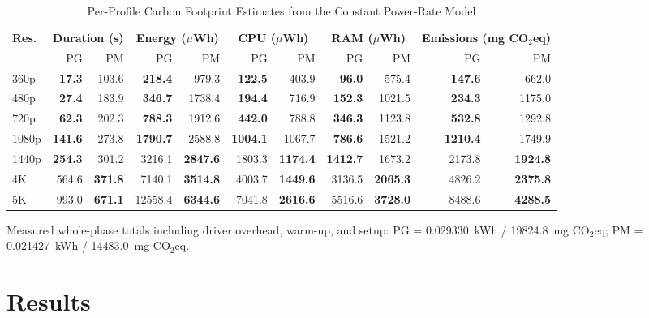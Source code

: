\documentclass[conference]{IEEEtran}
\begin{document}
\begin{table}[htbp]
\centering
\renewcommand{\arraystretch}{1.1}
\caption{Per-Profile Carbon Footprint Estimates from the Constant Power-Rate Model}
\label{tab:carbon_summary}
\begin{tabular}{l rr rr rr rr rr}
\hline
\textbf{Res.}
  & \multicolumn{2}{c}{\textbf{Duration (s)}}
  & \multicolumn{2}{c}{\textbf{Energy (\(\mu\)Wh)}}
  & \multicolumn{2}{c}{\textbf{CPU (\(\mu\)Wh)}}
  & \multicolumn{2}{c}{\textbf{RAM (\(\mu\)Wh)}}
  & \multicolumn{2}{c}{\textbf{Emissions (mg CO$_2$eq)}} \\
  & PG & PM & PG & PM & PG & PM & PG & PM & PG & PM \\
\hline
360p  & \textbf{17.3} & 103.6 & \textbf{218.4} & 979.3 & \textbf{122.5} & 403.9 & \textbf{96.0} & 575.4 & \textbf{147.6} & 662.0 \\
480p  & \textbf{27.4} & 183.9 & \textbf{346.7} & 1738.4 & \textbf{194.4} & 716.9 & \textbf{152.3} & 1021.5 & \textbf{234.3} & 1175.0 \\
720p  & \textbf{62.3} & 202.3 & \textbf{788.3} & 1912.6 & \textbf{442.0} & 788.8 & \textbf{346.3} & 1123.8 & \textbf{532.8} & 1292.8 \\
1080p & \textbf{141.6} & 273.8 & \textbf{1790.7} & 2588.8 & \textbf{1004.1} & 1067.7 & \textbf{786.6} & 1521.2 & \textbf{1210.4} & 1749.9 \\
1440p & \textbf{254.3} & 301.2 & 3216.1 & \textbf{2847.6} & 1803.3 & \textbf{1174.4} & \textbf{1412.7} & 1673.2 & 2173.8 & \textbf{1924.8} \\
4K    & 564.6 & \textbf{371.8} & 7140.1 & \textbf{3514.8} & 4003.7 & \textbf{1449.6} & 3136.5 & \textbf{2065.3} & 4826.2 & \textbf{2375.8} \\
5K    & 993.0 & \textbf{671.1} & 12558.4 & \textbf{6344.6} & 7041.8 & \textbf{2616.6} & 5516.6 & \textbf{3728.0} & 8488.6 & \textbf{4288.5} \\
\hline
\end{tabular}
\vspace{2pt}
\begin{minipage}{\textwidth}
\footnotesize Measured whole-phase totals including driver overhead, warm-up, and setup: PG = 0.029330~kWh / 19824.8~mg CO$_2$eq; PM = 0.021427~kWh / 14483.0~mg CO$_2$eq.
\end{minipage}
\end{table}

\section{Results}
\label{sec:results}
\end{document}
